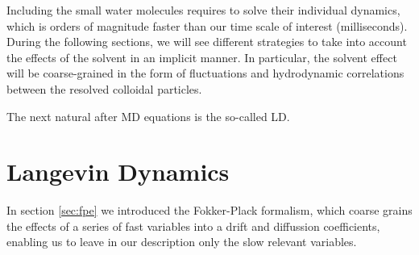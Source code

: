 \documentclass[ twoside,openright,titlepage,numbers=noenddot,%
headinclude,footinclude,cleardoublepage=empty,abstract=on,
BCOR=5mm,paper=a4,fontsize=11pt, dvipsnames
]{scrreprt}
\begin{document}
%
Including the small water molecules requires to solve their individual dynamics, which is orders of magnitude faster than our time scale of interest (milliseconds).
During the following sections, we will see different strategies to take into account the effects of the solvent in an implicit manner. In particular, the solvent effect will be coarse-grained in the form of fluctuations and hydrodynamic correlations between the resolved colloidal particles.

The next natural after \gls{MD} equations is the so-called \gls{LD}.

\chapter{Langevin Dynamics}\label{sec:langevin}

In section \ref{sec:fpe} we introduced the Fokker-Plack formalism, which coarse grains the effects of a series of fast variables into a drift and diffussion coefficients, enabling us to leave in our description only the slow relevant variables.
\end{document}

